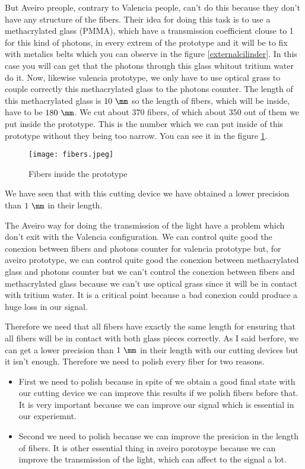 But Aveiro preople, contrary to Valencia people, can't do this because they don't have any structure of the fibers. Their idea for doing this task is to use a methacrylated glass (PMMA), which have a transmission coefficient clouse to 1 for this kind of photons, in every extrem of the prototype and it will be to fix with metalics belts which you can observe in the figure \ref{externalcilinder}. In this case you will can get that the photons through this glass whitout tritium water do it. Now, likewise valencia prototype, we only have to use optical grass to couple correctly this methacrylated glass to the photons counter. The length of this methacrylated glass is $10~\mm$ so the length of fibers, which will be inside, have to be $180~\mm$. We cut about $370$ fibers, of which about $350$ out of them we put inside the prototype. This is the number which we can put inside of this prototype without they being too narrow. You can see it in the figure \ref{fibers}. 

\begin{figure}[hbtp]
\centering
\texttt{[image: fibers.jpeg]}
\caption{Fibers inside the prototype \label{fibers}}
\end{figure}

We have seen that with this cutting device we have obtained a lower precision than $1~\mm$ in their length.

The Aveiro way for doing the transmission of the light have a problem which don't exit with the Valencia configuration. We can control quite good the conexion between fibers and photons counter for valencia prototype but, for aveiro prototype, we can control quite good the conexion between methacrylated glass and photons counter but we can't control the conexion between fibers and methacrylated glass because we can't use optical grass since it will be in contact with tritium water. It is a critical point because a bad conexion could produce a huge loss in our signal. 

Therefore we need that all fibers have exactly the same length for ensuring that all fibers will be in contact with both glass pieces correctly. As I said berfore, we can get a lower precision than $1~\mm$ in their length with our cutting devices but it isn't enough. Therefore we need to polish every fiber for two reasons.

\begin{itemize}
\item{} First we need to polish because in spite of we obtain a good final state with our cutting device we can improve this results if we polish fibers before that. It is very important because we can improve our signal which is essential in our experiemnt.
\item{} Second we need to polish because we can improve the presicion in the length of fibers. It is other essential thing in aveiro porotoype because we can improve the transmission of the light, which can affect to the signal a lot.
\end{itemize}

